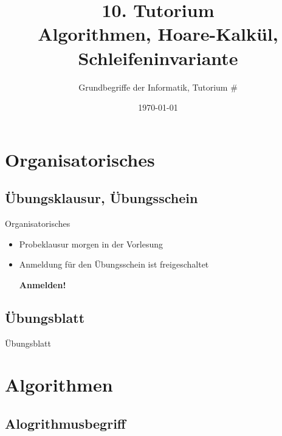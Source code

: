 




\title[Algorithmen]{10. Tutorium\\ Algorithmen, Hoare-Kalkül, Schleifeninvariante}
\subtitle{Grundbegriffe der Informatik, Tutorium \#\mytutnumber}
\date{\today}


\titleframe
\roadmap

\section{Organisatorisches}
\subsection{Übungsklausur, Übungsschein}
\begin{frame}{Organisatorisches}
\begin{itemize}
	\item Probeklausur morgen in der Vorlesung
	\item Anmeldung für den Übungsschein ist freigeschaltet\\
			\centerline{\textbf{Anmelden!}}
\end{itemize}
\end{frame}

\subsection{Übungsblatt}
\begin{frame}{Übungsblatt}
    \Stephan{}
    \Moritz{}
    \Alex{}
\end{frame}



\section{Algorithmen}
\subsection{Alogrithmusbegriff}

